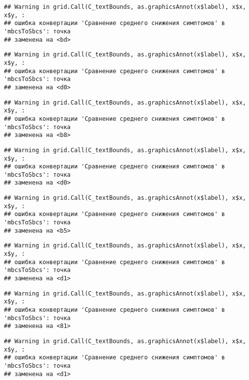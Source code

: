\documentclass[
]{article}
\begin{document}
\begin{verbatim}
## Warning in grid.Call(C_textBounds, as.graphicsAnnot(x$label), x$x, x$y, :
## ошибка конвертации 'Сравнение среднего снижения симптомов' в 'mbcsToSbcs': точка
## заменена на <bd>
\end{verbatim}

\begin{verbatim}
## Warning in grid.Call(C_textBounds, as.graphicsAnnot(x$label), x$x, x$y, :
## ошибка конвертации 'Сравнение среднего снижения симптомов' в 'mbcsToSbcs': точка
## заменена на <d0>
\end{verbatim}

\begin{verbatim}
## Warning in grid.Call(C_textBounds, as.graphicsAnnot(x$label), x$x, x$y, :
## ошибка конвертации 'Сравнение среднего снижения симптомов' в 'mbcsToSbcs': точка
## заменена на <b8>
\end{verbatim}

\begin{verbatim}
## Warning in grid.Call(C_textBounds, as.graphicsAnnot(x$label), x$x, x$y, :
## ошибка конвертации 'Сравнение среднего снижения симптомов' в 'mbcsToSbcs': точка
## заменена на <d0>
\end{verbatim}

\begin{verbatim}
## Warning in grid.Call(C_textBounds, as.graphicsAnnot(x$label), x$x, x$y, :
## ошибка конвертации 'Сравнение среднего снижения симптомов' в 'mbcsToSbcs': точка
## заменена на <b5>
\end{verbatim}

\begin{verbatim}
## Warning in grid.Call(C_textBounds, as.graphicsAnnot(x$label), x$x, x$y, :
## ошибка конвертации 'Сравнение среднего снижения симптомов' в 'mbcsToSbcs': точка
## заменена на <d1>
\end{verbatim}

\begin{verbatim}
## Warning in grid.Call(C_textBounds, as.graphicsAnnot(x$label), x$x, x$y, :
## ошибка конвертации 'Сравнение среднего снижения симптомов' в 'mbcsToSbcs': точка
## заменена на <81>
\end{verbatim}

\begin{verbatim}
## Warning in grid.Call(C_textBounds, as.graphicsAnnot(x$label), x$x, x$y, :
## ошибка конвертации 'Сравнение среднего снижения симптомов' в 'mbcsToSbcs': точка
## заменена на <d1>
\end{verbatim}
\end{document}
